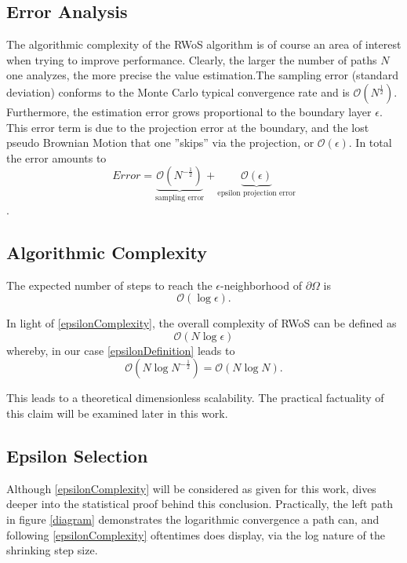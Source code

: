 \subsection{Error Analysis}\label{errorAnal}
The algorithmic complexity of the \Gls{RWoS} algorithm is of course an area of interest
when trying to improve performance. Clearly, the larger the number of paths $N$ one
analyzes, the more precise the value estimation.The sampling error (standard deviation)
conforms to the Monte Carlo typical convergence rate and
is $\mathcal{O}(N^{\frac{1}{2}})$. Furthermore, the estimation error grows proportional to
the boundary layer $\epsilon$.
This error term is due to the projection error at the boundary, and the lost
pseudo Brownian Motion that one ''skips'' via the projection, or  $\mathcal{O}(\epsilon)$.
In total the error amounts to $$Error = \underbrace{ \mathcal{O}(N^{-\frac{1}{2}})}_\text{sampling error} + \underbrace{\mathcal{O}(\epsilon)}_\text{epsilon projection error}$$\cite{Bornemann}\label{errorComplexity}.

\subsection{Algorithmic Complexity}

\begin{theorem}
The expected number of steps to reach the $\epsilon$-neighborhood of $\partial\Omega$
is $$\mathcal{O}(\log{}\epsilon).$$\cite{Bornemann,DeLaurentis}\label{epsilonComplexity}
\end{theorem}

In light of \ref{epsilonComplexity}, the overall complexity of \Gls{RWoS} can be
defined as $$\mathcal{O}(N \log{}\epsilon)$$ whereby, in our case \ref{epsilonDefinition}
 leads to $$\mathcal{O}(N \log{N^{-\frac{1}{2}}}) = \mathcal{O}(N \log{N}).$$

 This leads to a theoretical dimensionless scalability\cite{Bornemann}.  The practical factuality
 of this claim will be examined later in this work.

\subsection{Epsilon Selection}

Although \ref{epsilonComplexity} will be considered as given for this work, \cite{DeLaurentis}
dives deeper into the statistical proof behind this conclusion.  Practically, the
 left path in figure \ref{diagram} demonstrates the logarithmic convergence a path
 can, and following \ref{epsilonComplexity} oftentimes does display, via the log
 nature of the shrinking step size.

